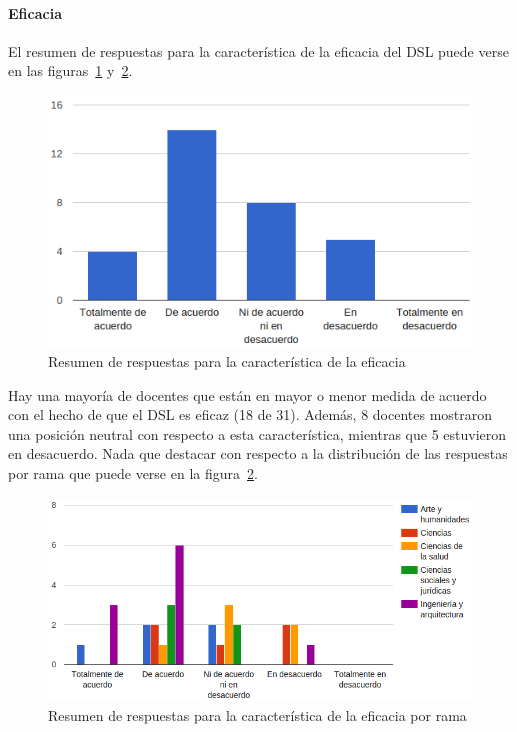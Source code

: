 \newpage
\paragraph*{Eficacia}

El resumen de respuestas para la característica de la eficacia del DSL puede verse en las figuras~\ref{fig:evalmetodo:dsl:eficacia} y~\ref{fig:evalmetodo:dsl:eficacia:rama}.

\begin{figure}[h]
  \begin{center}
    \includegraphics[scale=0.45]{C_DSL_eficacia.png}
  \end{center}
  \caption{Resumen de respuestas para la característica de la eficacia}
  \label{fig:evalmetodo:dsl:eficacia}
\end{figure}

Hay una mayoría de docentes que están en mayor o menor medida de acuerdo con el hecho de que el DSL es eficaz (18 de 31). Además, 8 docentes mostraron una posición neutral con respecto a esta característica, mientras que 5 estuvieron en desacuerdo. Nada que destacar con respecto a la distribución de las respuestas por rama que puede verse en la figura~\ref{fig:evalmetodo:dsl:eficacia:rama}.

\begin{figure}[h]
  \begin{center}
    \includegraphics[scale=0.5]{C_DSL_eficacia_rama.png}
  \end{center}
  \caption{Resumen de respuestas para la característica de la eficacia por rama}
  \label{fig:evalmetodo:dsl:eficacia:rama}
\end{figure}

